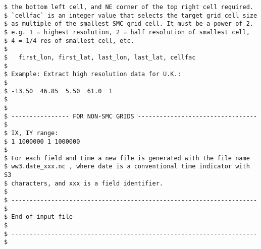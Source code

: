 \begin{footnotesize}
\begin{verbatim}
$ the bottom left cell, and NE corner of the top right cell required.
$ `cellfac` is an integer value that selects the target grid cell size
$ as multiple of the smallest SMC grid cell. It must be a power of 2.
$ e.g. 1 = highest resolution, 2 = half resolution of smallest cell, 
$ 4 = 1/4 res of smallest cell, etc.
$
$   first_lon, first_lat, last_lon, last_lat, cellfac
$ 
$ Example: Extract high resolution data for U.K.:
$
$ -13.50  46.85  5.50  61.0  1
$
$
$ ---------------- FOR NON-SMC GRIDS --------------------------------- $
$ IX, IY range:
$ 1 1000000 1 1000000 
$
$ For each field and time a new file is generated with the file name
$ ww3.date_xxx.nc , where date is a conventional time indicator with S3
$ characters, and xxx is a field identifier.
$
$ -------------------------------------------------------------------- $
$ End of input file                                                    $
$ -------------------------------------------------------------------- $
\end{verbatim}
\end{footnotesize}
